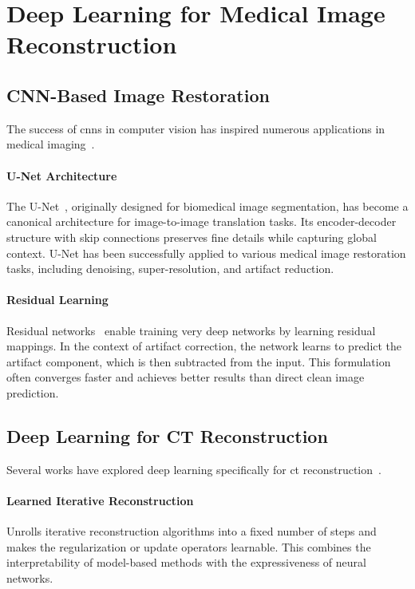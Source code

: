 \section{Deep Learning for Medical Image Reconstruction}

\subsection{CNN-Based Image Restoration}

The success of \glspl{cnn} in computer vision has inspired numerous applications in medical imaging~\cite{wang2016deep}.

\paragraph{U-Net Architecture} The U-Net~\cite{ronneberger2015unet}, originally designed for biomedical image segmentation, has become a canonical architecture for image-to-image translation tasks. Its encoder-decoder structure with skip connections preserves fine details while capturing global context. U-Net has been successfully applied to various medical image restoration tasks, including denoising, super-resolution, and artifact reduction.

\paragraph{Residual Learning} Residual networks~\cite{he2016deep} enable training very deep networks by learning residual mappings. In the context of artifact correction, the network learns to predict the artifact component, which is then subtracted from the input. This formulation often converges faster and achieves better results than direct clean image prediction.

\subsection{Deep Learning for CT Reconstruction}

Several works have explored deep learning specifically for \gls{ct} reconstruction~\cite{jin2017deep, wurfl2016deep}.

\paragraph{Learned Iterative Reconstruction} Unrolls iterative reconstruction algorithms into a fixed number of steps and makes the regularization or update operators learnable. This combines the interpretability of model-based methods with the expressiveness of neural networks.

